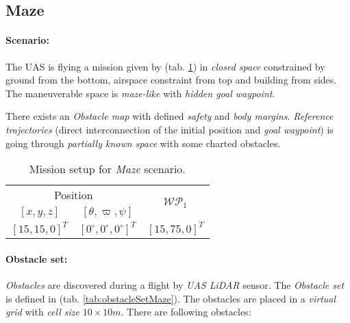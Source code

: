 \subsection{Maze}\label{s:testMaze}

\paragraph{Scenario:} The UAS is flying a mission given by (tab. \ref{tab:missionSetupMazeScenario}) in \emph{closed space} constrained by ground from the bottom, airspace constraint from top and building from sides. The maneuverable space is \emph{maze-like} with  \emph{hidden goal waypoint}.

There exists an \emph{Obstacle map} with defined \emph{safety} and \emph{body margins}. \emph{Reference trajectories} (direct interconnection of the initial position and \emph{goal waypoint}) is going through \emph{partially known space} with some charted obstacles.

\begin{table}[H]
    \centering
    \begin{tabular}{c|c||c}
        \multicolumn{2}{c||}{Position} & \multirow{2}{*}{$\mathscr{WP}_1$} \\\cline{1-2}
        $[x,y,z]$           & $[\theta,\varpi,\psi]$           & \\\hline\hline
        $[15,15,0]^T $        & $[0^\circ,0^\circ,0^\circ]^T$    & $[15,75,0]^T$        \\ 
    \end{tabular}
    \caption{Mission setup for \emph{Maze} scenario.}
    \label{tab:missionSetupMazeScenario}
\end{table}

\paragraph{Obstacle set:} \emph{Obstacles} are discovered during a flight by \emph{UAS LiDAR} sensor. The \emph{Obstacle set} is defined in (tab. \ref{tab:obstacleSetMaze}). The obstacles are placed in a \emph{virtual grid} with \emph{cell size} $10 \times 10 m$. There are following obstacles:

